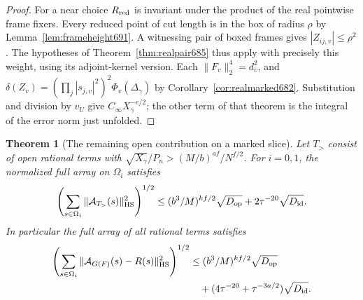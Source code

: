 \documentclass[a4paper,11pt]{article}
\newtheorem{theorem}[proposition]{Theorem}
\theoremstyle{definition}
\theoremstyle{remark}
\numberwithin{equation}{section}
\begin{document}
\begin{proof}
For a near choice \(R_{\rm red}\) is invariant under the
product of the real pointwise frame fixers. Every reduced
point of cut length is in the box of radius \(\rho\) by
Lemma~\ref{lem:frameheight691}. A witnessing pair of boxed
frames gives \(|Z_{ij,v}|\le\rho^2\). The hypotheses of
Theorem~\ref{thm:realpair685} thus apply with precisely
this weight, using its adjoint-kernel version. Each
\(\|F_v\|_2^4=d_v^2\), and
\(\delta(Z_v)=(\prod_j |s_{j,v}|^2)^2\Phi_v(\Delta_\gamma)\)
by Corollary~\ref{cor:realmarked682}. Substitution and division
by \(v_U\) give \(C_\infty X_\gamma^{-e/2}\); the other term of
that theorem is the integral of the error norm just unfolded.
\end{proof}

\begin{theorem}[The remaining open contribution on a marked slice]\leavevmode
\label{thm:signedopen702}
Let \(T_>\) consist of open rational terms with
\(\sqrt{X_\gamma}/P_n>(M/b)^{af}/N^{f/2}\). For \(i=0,1\),
the normalized full array on \(\Omega_i\) satisfies
\[
 \left(\sum_{s\in\Omega_i}\|\mathcal A_{T_>}(s)\|_{\rm HS}^2\right)^{1/2}
 \le (b^3/M)^{kf/2}\sqrt{D_{\rm op}}
                              +2\tau^{-20}\sqrt{D_{\rm id}} .
\]
In particular the full array of all rational terms satisfies
\[
 \begin{split}
 \left(\sum_{s\in\Omega_i}
       \|\mathcal A_{G(F)}(s)-R(s)\|_{\rm HS}^2\right)^{1/2}
 &\le (b^3/M)^{kf/2}\sqrt{D_{\rm op}}\\
 &\quad+(4\tau^{-20}+\tau^{-3a/2})\sqrt{D_{\rm id}} .
 \end{split}
\]
\end{theorem}
\end{document}
